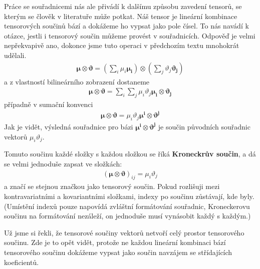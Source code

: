 \documentclass[a5paper,12pt]{amsbook}
\theoremstyle{definition}
\newcommand{\myvec}[1]{\bm{#1}}
\begin{document}
Práce se souřadnicemi nás ale přivádí k dalšímu způsobu zavedení tensorů, se kterým se
člověk v literatuře může potkat. Náš tensor je lineární kombinace tensorových součinů
bází a dokážeme ho vypsat jako pole čísel. To nás navádí k otázce, jestli i tensorový
součin můžeme provést v souřadnicích. Odpověď je velmi nepřekvapivě ano, dokonce jsme
tuto operaci v předchozím textu mnohokrát udělali.
\begin{equation*}
\begin{split}
\myvec{\mu}\otimes\myvec{\vartheta} 
= \left(\sum_i\mu_i\myvec{\mu_i}\right)\otimes\left(\sum_j\vartheta_j\myvec{\vartheta_j}\right)
\end{split}
\end{equation*}
a z vlastností bilineárního zobrazení dostaneme
\begin{equation*}
\begin{split}
\myvec{\mu}\otimes\myvec{\vartheta} 
= \sum_i\sum_j\mu_i\vartheta_j\myvec{\mu_i}\otimes\myvec{\vartheta_j}
\end{split}
\end{equation*}
případně v sumační konvenci
\begin{equation*}
\begin{split}
\myvec{\mu}\otimes\myvec{\vartheta} = \mu_i\vartheta_j\myvec{\mu^i}\otimes\myvec{\vartheta^j}
\end{split}
\end{equation*}
Jak je vidět, výsledná souřadnice pro bázi $\myvec{\mu^i}\otimes\myvec{\vartheta^j}$ je
součin původních souřadnic vektorů $\mu_i\vartheta_j$.

Tomuto součinu každé složky s každou složkou se říká \textbf{Kroneckrův součin}, a dá
se velmi jednoduše zapsat ve složkách:
\begin{equation*}
\begin{split}
\left(\myvec{\mu}\otimes\myvec{\vartheta}\right)_{ij} = \mu_i\vartheta_j
\end{split}
\end{equation*}
a značí se stejnou značkou jako tensorový součin. Pokud rozlišuji mezi kontravariatními
a kovariantními složkami, indexy po součinu zůstávají, kde byly. (Umístění indexů pouze
napovídá zvláštní formátování souřadnic, Kroneckerovu součinu na formátování nezáleží,
on jednoduše musí vynásobit každý s každým.)

Už jsme si řekli, že tensorové součiny vektorů netvoří celý prostor tensorového součinu.
Zde je to opět vidět, protože ne každou lineární kombinaci bází tensorového součinu dokážeme
vypsat jako součin navzájem se střídajících koeficientů.
\end{document}
